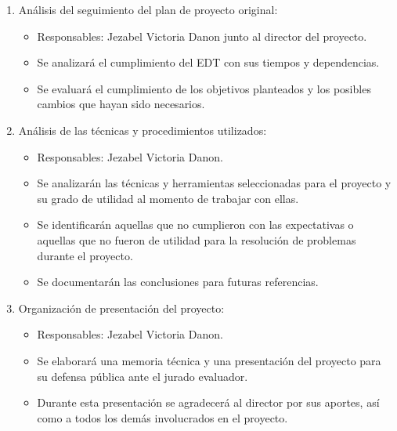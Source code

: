 \documentclass[
11pt, %
]{charter}
\begin{document}
\begin{enumerate}
	\item Análisis del seguimiento del plan de proyecto original:
	\begin{itemize}
		\item Responsables: Jezabel Victoria Danon junto al director del proyecto. 
		\item Se analizará el cumplimiento del EDT con sus tiempos y dependencias.
		\item Se evaluará el cumplimiento de los objetivos planteados y los posibles cambios que hayan sido necesarios.
	\end{itemize}
	\item Análisis de las técnicas y procedimientos utilizados:
	\begin{itemize}
		\item Responsables: Jezabel Victoria Danon. 
		\item Se analizarán las técnicas y herramientas seleccionadas para el proyecto y su grado de utilidad al momento de trabajar con ellas.
		\item Se identificarán aquellas que no cumplieron con las expectativas o aquellas que no fueron de utilidad para la resolución de problemas durante el proyecto.
		\item Se documentarán las conclusiones para futuras referencias.
	\end{itemize}
	\item Organización de presentación del proyecto:
	\begin{itemize}
		\item Responsables: Jezabel Victoria Danon. 
		\item Se elaborará una memoria técnica y una presentación del proyecto para su defensa pública ante el jurado evaluador. 
		\item Durante esta presentación se agradecerá al director por sus aportes, así como a todos los demás involucrados en el proyecto.
	\end{itemize}
\end{enumerate}


\end{document}

